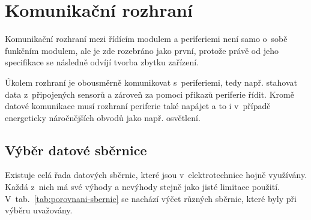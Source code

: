 \section{Komunikační rozhraní}
\label{sec:komunikacni-rozhrani}
    Komunikační rozhraní mezi řídícím modulem a periferiemi není samo o~sobě funkčním modulem, ale je zde rozebráno jako první, protože právě od jeho specifikace se následně odvíjí tvorba zbytku zařízení. 

    Úkolem rozhraní je obousměrně komunikovat s~periferiemi, tedy např. stahovat data z~připojených sensorů a zároveň za pomoci přikazů periferie řídit. Kromě datové komunikace musí rozhraní periferie také napájet a to i v~případě energeticky náročnějších obvodů jako např. osvětlení. 
    
    \subsection{Výběr datové sběrnice}
        Existuje celá řada datových sběrnic, které jsou v~elektrotechnice hojně využívány. Každá z~nich má své výhody a nevýhody stejně jako jisté limitace použití. V~tab.~\ref{tab:porovnani-sbernic} se nachází výčet různých sběrnic, které byly při výběru uvažovány. 


